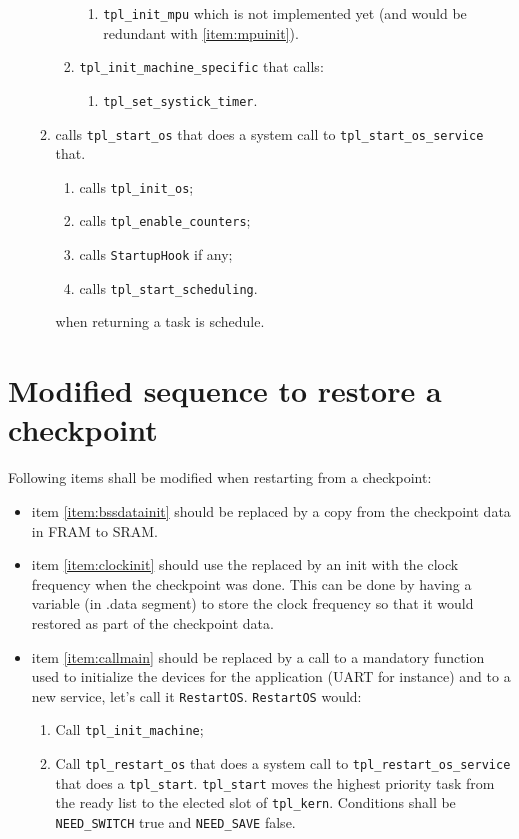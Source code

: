 \documentclass[11pt, oneside]{article}   	%
\begin{document}
\begin{enumerate}
\begin{enumerate}
\begin{enumerate}
\begin{enumerate}
				\item \lstinline{tpl_init_mpu} which is not implemented yet (and would be redundant with \ref{item:mpuinit}).
			\end{enumerate}
		\item \lstinline{tpl_init_machine_specific} that calls:
			\begin{enumerate}
				\item \lstinline{tpl_set_systick_timer}.
			\end{enumerate}
		\end{enumerate}
	\item calls \lstinline{tpl_start_os} that does a system call to \lstinline{tpl_start_os_service} that.
		\begin{enumerate}
		\item calls \lstinline{tpl_init_os};
		\item calls \lstinline{tpl_enable_counters};
		\item calls \lstinline{StartupHook} if any;
		\item calls \lstinline{tpl_start_scheduling}.
		\end{enumerate}
		when returning a task is schedule.
	\end{enumerate}
\end{enumerate}

\section{Modified sequence to restore a checkpoint}\label{sec:checkpointrestore}

Following items shall be modified when restarting from a checkpoint:

\begin{itemize}
\item item \ref{item:bssdatainit} should be replaced by a copy from the checkpoint data in FRAM to SRAM.
\item item \ref{item:clockinit} should use the replaced by an init with the clock frequency when the checkpoint was done. This can be done by having a variable (in .data segment) to store the clock frequency so that it would restored as part of the checkpoint data.
\item item \ref{item:callmain} should be replaced by a call to a mandatory function used to initialize the devices for the application (UART for instance) and to a new service, let's call it \lstinline{RestartOS}. \lstinline{RestartOS} would:
	\begin{enumerate}
	\item Call \lstinline{tpl_init_machine};
	\item Call \lstinline{tpl_restart_os} that does a system call to \lstinline{tpl_restart_os_service} that does a \lstinline{tpl_start}. \lstinline{tpl_start} moves the highest priority task from the ready list to the elected slot of \lstinline{tpl_kern}. Conditions shall be \lstinline{NEED_SWITCH} true and \lstinline{NEED_SAVE} false.  
	\end{enumerate}
\end{itemize}
\end{document}
